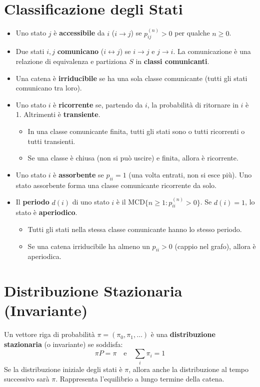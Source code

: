 \documentclass[12pt,a4paper]{article}
\begin{document}
\begin{example}
\section{Classificazione degli Stati}
\begin{itemize}
    \item Uno stato $j$ è \textbf{accessibile} da $i$ ($i \to j$) se $p_{ij}^{(n)} > 0$ per qualche $n \ge 0$.
    \item Due stati $i,j$ \textbf{comunicano} ($i \leftrightarrow j$) se $i \to j$ e $j \to i$. La comunicazione è una relazione di equivalenza e partiziona $S$ in \textbf{classi comunicanti}.
    \item Una catena è \textbf{irriducibile} se ha una sola classe comunicante (tutti gli stati comunicano tra loro).
    \item Uno stato $i$ è \textbf{ricorrente} se, partendo da $i$, la probabilità di ritornare in $i$ è 1. Altrimenti è \textbf{transiente}.
    \begin{itemize}
        \item In una classe comunicante finita, tutti gli stati sono o tutti ricorrenti o tutti transienti.
        \item Se una classe è chiusa (non si può uscire) e finita, allora è ricorrente.
    \end{itemize}
    \item Uno stato $i$ è \textbf{assorbente} se $p_{ii}=1$ (una volta entrati, non si esce più). Uno stato assorbente forma una classe comunicante ricorrente da solo.
    \item Il \textbf{periodo} $d(i)$ di uno stato $i$ è il MCD$\{n \ge 1 : p_{ii}^{(n)} > 0\}$. Se $d(i)=1$, lo stato è \textbf{aperiodico}.
    \begin{itemize}
        \item Tutti gli stati nella stessa classe comunicante hanno lo stesso periodo.
        \item Se una catena irriducibile ha almeno un $p_{ii}>0$ (cappio nel grafo), allora è aperiodica.
    \end{itemize}
\end{itemize}

\section{Distribuzione Stazionaria (Invariante)}
\begin{definition}
Un vettore riga di probabilità $\pi = (\pi_0, \pi_1, \dots)$ è una \textbf{distribuzione stazionaria} (o invariante) se soddisfa:
\[ \pi P = \pi \quad \text{e} \quad \sum_i \pi_i = 1 \]
Se la distribuzione iniziale degli stati è $\pi$, allora anche la distribuzione al tempo successivo sarà $\pi$. Rappresenta l'equilibrio a lungo termine della catena.
\end{definition}


\end{example}
\end{document}
